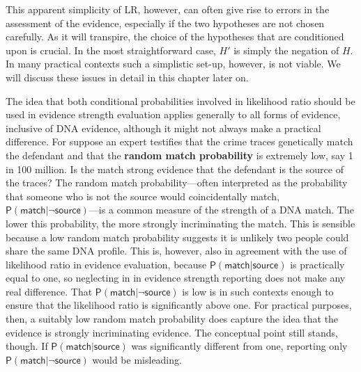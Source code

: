 \documentclass[
  10pt,
  dvipsnames,enabledeprecatedfontcommands]{scrartcl}
\newcommand{\pr}[1]{\mathsf{P}(#1)}
\begin{document}
This apparent simplicity of \textsf{LR}, however, can often give rise to
errors in the assessment of the evidence, especially if the two
hypotheses are not chosen carefully. As it will transpire, the choice of
the hypotheses that are conditioned upon is crucial. In the most
straightforward case, \(H'\) is simply the negation of \(H\). In many
practical contexts such a simplistic set-up, however, is not viable. We
will discuss these issues in detail in this chapter later on.

The idea that both conditional probabilities involved in likelihood
ratio should be used in evidence strength evaluation applies generally
to all forms of evidence, inclusive of DNA evidence, although it might
not always make a practical difference. For suppose an expert testifies
that the crime traces genetically match the defendant and that the
\textbf{random match probability} is extremely low, say 1 in 100
million. Is the match strong evidence that the defendant is the source
of the traces? The random match probability---often interpreted as the
probability that someone who is not the source would coincidentally
match, \(\pr{\textsf{match} \vert \neg \textsf{source}}\)---is a common
measure of the strength of a DNA match. The lower this probability, the
more strongly incriminating the match. This is sensible because a low
random match probability suggests it is unlikely two people could share
the same DNA profile. This is, however, also in agreement with the use
of likelihood ratio in evidence evaluation, because
\(\pr{\textsf{match} \vert \textsf{source}}\) is practically equal to
one, so neglecting in in evidence strength reporting does not make any
real difference. That \(\pr{\textsf{match} \vert \neg \textsf{source}}\)
is low is in such contexts enough to ensure that the likelihood ratio is
significantly above one. For practical purposes, then, a suitably low
random match probability does capture the idea that the evidence is
strongly incriminating evidence. The conceptual point still stands,
though. If \(\pr{\textsf{match} \vert \textsf{source}}\) was
significantly different from one, reporting only
\(\pr{\textsf{match} \vert \neg \textsf{source}}\) would be misleading.
\end{document}
